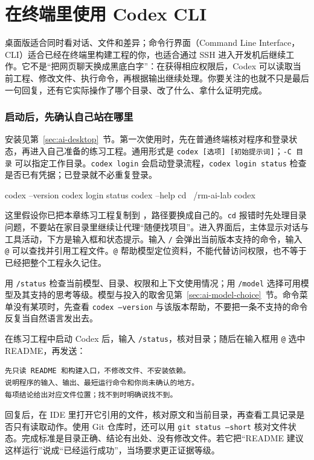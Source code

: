 \section{在终端里使用 Codex CLI}
\label{sec:ai-cli}

桌面版适合同时看对话、文件和差异；命令行界面（Command Line Interface，CLI）适合已经在终端里构建工程的你，也适合通过 SSH 进入开发机后继续工作。它不是“把网页聊天换成黑底白字”：在获得相应权限后，Codex 可以读取当前工程、修改文件、执行命令，再根据输出继续处理。你要关注的也就不只是最后一句回复，还有它实际操作了哪个目录、改了什么、拿什么证明完成。

\subsubsection{启动后，先确认自己站在哪里}

安装见第~\ref{sec:ai-desktop}~节。第一次使用时，先在普通终端核对程序和登录状态，再进入自己准备的练习工程。通用形式是 \texttt{codex [选项] [初始提示词]}；\texttt{-C 目录} 可以指定工作目录。\texttt{codex login} 会启动登录流程，\texttt{codex login status} 检查是否已有凭据；已登录就不必重复登录。

\begin{tbash}
codex --version
codex login status
codex --help
cd ~/rm-ai-lab
codex
\end{tbash}

这里假设你已把本章练习工程复制到 ，路径要换成自己的。\texttt{cd} 报错时先处理目录问题，不要站在家目录里继续让代理“随便找项目”。进入界面后，主体显示对话与工具活动，下方是输入框和状态提示。输入 \texttt{/} 会弹出当前版本支持的命令，输入 \texttt{@} 可以查找并引用工程文件。\texttt{@} 帮助模型定位资料，不能代替访问权限，也不等于已经把整个工程永久记住。

用 \texttt{/status} 检查当前模型、目录、权限和上下文使用情况；用 \texttt{/model} 选择可用模型及其支持的思考等级。模型与投入的取舍见第~\ref{sec:ai-model-choice}~节。命令菜单没有某项时，先查看 \texttt{codex --version} 与该版本帮助，不要把一条不支持的命令反复当自然语言发出去。

\begin{example}[第一次对话只读工程]
在练习工程中启动 Codex 后，输入 \texttt{/status}，核对目录；随后在输入框用 \texttt{@} 选中 README，再发送：
\begin{lstlisting}[language={}]
先只读 README 和构建入口，不修改文件、不安装依赖。
说明程序的输入、输出、最短运行命令和你尚未确认的地方。
每项结论给出对应文件位置；找不到时明确说找不到。
\end{lstlisting}
回复后，在 IDE 里打开它引用的文件，核对原文和当前目录，再查看工具记录是否只有读取动作。使用 Git 仓库时，还可以用 \texttt{git status --short} 核对文件状态。完成标准是目录正确、结论有出处、没有修改文件。若它把“README 建议这样运行”说成“已经运行成功”，当场要求更正证据等级。
\end{example}

